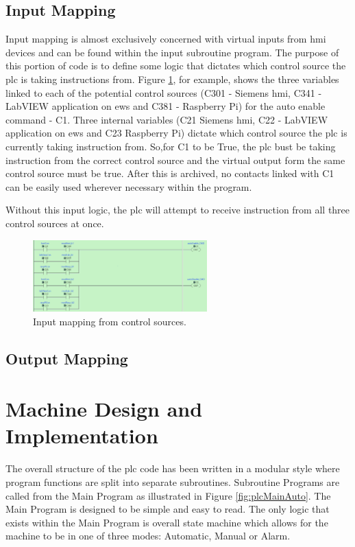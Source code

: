     \subsection{Input Mapping} \label{sec:input}
        Input mapping is almost exclusively concerned with virtual inputs from \acrshort{hmi} devices and can be found within the input subroutine program. The purpose of this portion of code is to define some logic that dictates which control source the \acrshort{plc} is taking instructions from. Figure \ref{fig:inputMapping}, for example, shows the three variables linked to each of the potential control sources (C301 - Siemens \acrshort{hmi}, C341 - LabVIEW application on \acrshort{ews} and C381 - Raspberry Pi) for the auto enable command - C1. Three internal variables (C21 Siemens \acrshort{hmi}, C22 - LabVIEW application on \acrshort{ews} and C23 Raspberry Pi) dictate which control source the \acrshort{plc} is currently taking instruction from. So,for C1 to be True, the \acrshort{plc} bust be taking instruction from the correct control source and the virtual output form the same control source must be true. After this is archived, \acrshort{no} contacts linked with C1 can be easily used wherever necessary within the program. 

        Without this input logic, the \acrshort{plc} will attempt to receive instruction from all three control sources at once.
        
        \begin{figure}[H]
            \centering
            \includegraphics[width = 0.6\textwidth]{2_images/inputMapping}
            \caption{Input mapping from control sources.}
            \label{fig:inputMapping}
        \end{figure}
        
    \subsection{Output Mapping} \label{sec:output}


\section{Machine Design and Implementation}
    The overall structure of the \acrshort{plc} code has been written in a modular style where program functions are split into separate subroutines. Subroutine Programs are called from the Main Program as illustrated in Figure \ref{fig:plcMainAuto}. The Main Program is designed to be simple and easy to read. The only logic that exists within the Main Program is overall state machine which allows for the machine to be in one of three modes: Automatic, Manual or Alarm. 

